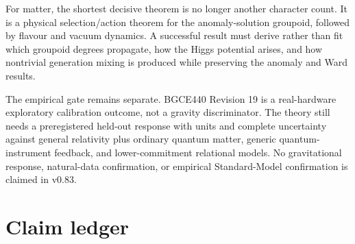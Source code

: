 \documentclass[11pt]{article}
\theoremstyle{definition}
\theoremstyle{remark}
\begin{document}
For matter, the shortest decisive theorem is no longer another character count. It is a physical selection/action theorem for the anomaly-solution groupoid, followed by flavour and vacuum dynamics. A successful result must derive rather than fit which groupoid degrees propagate, how the Higgs potential arises, and how nontrivial generation mixing is produced while preserving the anomaly and Ward results.

The empirical gate remains separate. BGCE440 Revision 19 is a real-hardware exploratory calibration outcome, not a gravity discriminator. The theory still needs a preregistered held-out response with units and complete uncertainty against general relativity plus ordinary quantum matter, generic quantum-instrument feedback, and lower-commitment relational models. No gravitational response, natural-data confirmation, or empirical Standard-Model confirmation is claimed in v0.83.

\section{Claim ledger}
\end{document}
